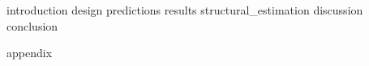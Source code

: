 \documentclass[a4paper, 10pt]{article}
\begin{document}

 \frenchspacing



\clearpage

{introduction}
{design}
{predictions}
{results}
{structural_estimation}
{discussion}
{conclusion}

\begin{appendices}
	\label{sec:appendix}
 	\FloatBarrier
	{appendix}
 	\newpage
\end{appendices}

\newpage
 

\begin{refcontext}[sorting=nyt]  %
\printbibliography[heading=bibintoc]
\end{refcontext}
\end{document}
